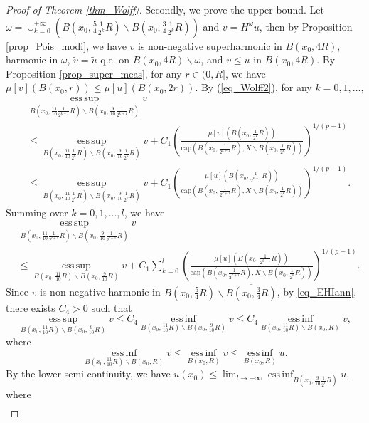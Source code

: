 \documentclass[11pt,a4paper]{article}
\numberwithin{equation}{section}
\newcommand{\esup}{\operatorname*{ess\,sup}}
\newcommand{\einf}{\operatorname*{ess\,inf}}
\theoremstyle{plain}
\theoremstyle{definition}
\begin{document}
\begin{proof}[Proof of Theorem \ref{thm_Wolff}]
Secondly, we prove the upper bound. Let $\omega=\cup_{k=0}^{+\infty}(B(x_0,\frac{5}{4}\frac{1}{2^k}R)\backslash\overline{B(x_0,\frac{3}{4}\frac{1}{2^k}R)})$ and $v=H^\omega u$, then by Proposition \ref{prop_Pois_modi}, we have $v$ is non-negative superharmonic in $B(x_0,4R)$, harmonic in $\omega$, $\widetilde{v}=\widetilde{u}$ q.e. on $B(x_0,4R)\backslash\omega$, and $v\le u$ in $B(x_0,4R)$. By Proposition \ref{prop_super_meas}, for any $r\in(0,{R}]$, we have $\mu[v](B(x_0,r))\le\mu[u](B(x_0,2r))$. By (\ref{eq_Wolff2}), for any $k=0,1,\ldots$,
\begin{align*}
&\esup_{B(x_0,\frac{11}{10}\frac{1}{2^{k+1}}R)\backslash {B(x_0,\frac{9}{10}\frac{1}{2^{k+1}}R)}}v\\
&\le\esup_{B(x_0,\frac{11}{10}\frac{1}{2^{k}}R)\backslash {B(x_0,\frac{9}{10}\frac{1}{2^{k}}R)}}v+C_1 \left(\frac{\mu[v](B(x_0,\frac{1}{2^k}R))}{\mathrm{cap}\left(B(x_0,\frac{1}{2^{k+1}}R),X\backslash B(x_0,\frac{1}{2^k}R)\right)}\right)^{1/(p-1)}\\
&\le\esup_{B(x_0,\frac{11}{10}\frac{1}{2^{k}}R)\backslash {B(x_0,\frac{9}{10}\frac{1}{2^{k}}R)}}v+C_1 \left(\frac{\mu[u](B(x_0,\frac{1}{2^{k-1}}R))}{\mathrm{cap}\left(B(x_0,\frac{1}{2^{k+1}}R),X\backslash B(x_0,\frac{1}{2^k}R)\right)}\right)^{1/(p-1)}.
\end{align*}
Summing over $k=0,1,\ldots,l$, we have
\begin{align*}
&\esup_{B(x_0,\frac{11}{10}\frac{1}{2^{l+1}}R)\backslash {B(x_0,\frac{9}{10}\frac{1}{2^{l+1}}R)}}v\\
&\le\esup_{B(x_0,\frac{11}{10}R)\backslash {B(x_0,\frac{9}{10}R)}}v+C_1\sum_{k=0}^l\left(\frac{\mu[u](B(x_0,\frac{1}{2^{k-1}}R))}{\mathrm{cap}\left(B(x_0,\frac{1}{2^{k+1}}R),X\backslash B(x_0,\frac{1}{2^k}R)\right)}\right)^{1/(p-1)}.
\end{align*}
Since $v$ is non-negative harmonic in $B(x_0,\frac{5}{4}R)\backslash \overline{B(x_0,\frac{3}{4}R)}$, by \ref{eq_EHIann}, there exists $C_4>0$ such that
\begin{equation*}
\esup_{B(x_0,\frac{11}{10}R)\backslash {B(x_0,\frac{9}{10}R)}}v\le C_4\einf_{B(x_0,\frac{11}{10}R)\backslash {B(x_0,\frac{9}{10}R)}}v\le C_4\einf_{B(x_0,\frac{11}{10}R)\backslash {B(x_0,R)}}v,
\end{equation*}
where
$$\einf_{B(x_0,\frac{11}{10}R)\backslash {B(x_0,R)}}v\le\einf_{B(x_0,R)}v\le\einf_{B(x_0,R)}u.$$
By the lower semi-continuity, we have $u(x_0)\le\lim_{l\to+\infty}\einf_{B(x_0,\frac{9}{10}\frac{1}{2^{l}}R)}u$, where
\begin{align*}

\end{align*}
\end{proof}
\end{document}
